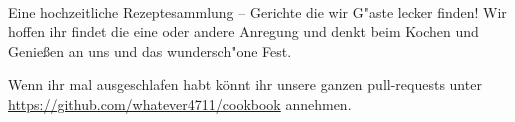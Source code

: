 \documentclass[%
a4paper,
twoside,
12pt
]{article}
\begin{document}
\clearpage
~\thispagestyle{empty}
\clearpage
\thispagestyle{empty}
~
\vfill
\begin{center}
\end{center}


    Eine hochzeitliche Rezeptesammlung -- Gerichte die wir G"aste lecker finden! Wir hoffen ihr findet die eine oder andere Anregung und denkt beim Kochen und Genießen an uns und das wundersch"one Fest.
    
    Wenn ihr mal ausgeschlafen habt könnt ihr unsere ganzen pull-requests unter \url{https://github.com/whatever4711/cookbook} annehmen.
\end{document}
